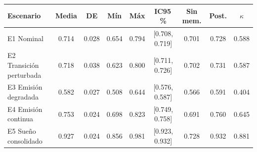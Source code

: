 \begin{tabular}{lcccccccc}
\toprule
\textbf{Escenario} & \textbf{Media} & \textbf{DE} & \textbf{Mín} & \textbf{Máx} & \textbf{IC95\,\%} & \textbf{Sin mem.} & \textbf{Post.} & \textbf{$\kappa$} \\
\midrule
E1 Nominal & 0.714 & 0.028 & 0.654 & 0.794 & [0.708, 0.719] & 0.701 & 0.728 & 0.588 \\
E2 Transición perturbada & 0.718 & 0.038 & 0.623 & 0.800 & [0.711, 0.726] & 0.702 & 0.731 & 0.587 \\
E3 Emisión degradada & 0.582 & 0.027 & 0.508 & 0.644 & [0.576, 0.587] & 0.566 & 0.591 & 0.404 \\
E4 Emisión continua & 0.753 & 0.024 & 0.698 & 0.823 & [0.749, 0.758] & 0.691 & 0.760 & 0.645 \\
E5 Sueño consolidado & 0.927 & 0.024 & 0.856 & 0.981 & [0.923, 0.932] & 0.728 & 0.932 & 0.881 \\
\bottomrule
\end{tabular}
